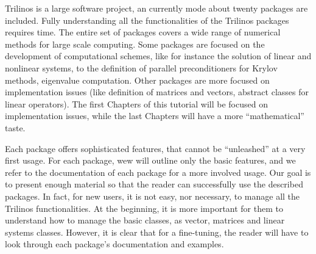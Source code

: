 \smallskip

Trilinos is a large software project, an currently mode about twenty
packages are included. Fully understanding all the functionalities of
the Trilinos packages requires time. The entire set of packages covers a
wide range of numerical methods for large scale computing. Some packages
are focused on the development of computational schemes, like for
instance the solution of linear and nonlinear systems, to the definition
of parallel preconditioners for Krylov methods, eigenvalue computation.
Other packages are more focused on implementation issues (like
definition of matrices and vectors, abstract classes for linear
operators). The first Chapters of this tutorial will be focused on
implementation issues, while the last Chapters will have a more
``mathematical'' taste. 

Each package offers sophisticated features, that cannot be ``unleashed''
at a very first usage. For each package, wew will outline only the basic
features, and we refer to the documentation of each package for a more
involved usage. Our goal is to present enough material so that the
reader can successfully use the described packages.  In fact, for new
users, it is not easy, nor necessary, to manage all the Trilinos
functionalities. At the beginning, it is more important for them to
understand how to manage the basic classes, as vector, matrices and
linear systems classes. However, it is clear that for a fine-tuning, the
reader will have to look through each package's documentation and
examples.

\medskip


